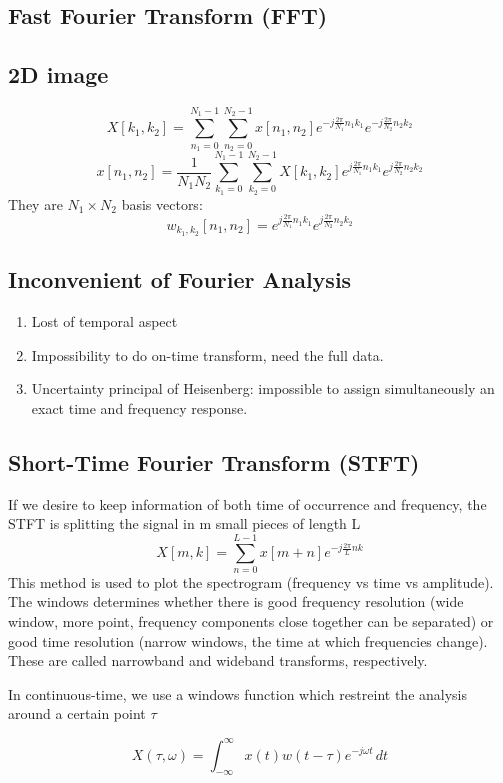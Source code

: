\documentclass[twocolumn]{article}
\numberwithin{equation}{section}
\begin{document}
	\subsection{Fast Fourier Transform (FFT)}


	\subsection{2D image}
$$X[k_1,k_2]= \sum_{n_1=0}^{N_1 -1} \sum_{n_2=0}^{N_2 -1} x[n_1,n_2] e^{-j \frac{2 \pi}{N_1}n_1 k_1}  e^{-j \frac{2 \pi}{N_2}n_2 k_2}$$
$$x[n_1,n_2]= \frac{1}{N_1 N_2} \sum_{k_1=0}^{N_1 -1} \sum_{k_2=0}^{N_2 -1} X[k_1,k_2] e^{j \frac{2 \pi}{N_1}n_1 k_1}  e^{j \frac{2 \pi}{N_2}n_2 k_2}$$
They are $N_1 \times N_2$ basis vectors:
$$w_{k_1,k_2}[n_1,n_2]=e^{j \frac{2 \pi}{N_1}n_1 k_1}  e^{j \frac{2 \pi}{N_2}n_2 k_2}$$



	\subsection{Inconvenient of Fourier Analysis}
\begin{enumerate}
	\item Lost of temporal aspect
	\item Impossibility to do on-time transform, need the full data.
	\item Uncertainty principal of Heisenberg: impossible to assign simultaneously an exact time and frequency response.
\end{enumerate}


	\subsection{Short-Time Fourier Transform (STFT)}
If we desire to keep information of both time of occurrence and frequency, the STFT is splitting the signal in m small pieces of length L
$$X[m,k]=\sum_{n=0}^{L-1} x[m+n]e^{-j\frac{2 \pi}{L}nk}$$
This method is used to plot the spectrogram (frequency vs time vs amplitude). The windows determines whether there is good frequency resolution (wide window, more point, frequency components close together can be separated) or good time resolution (narrow windows, the time at which frequencies change). These are called narrowband and wideband transforms, respectively.

In continuous-time, we use a windows function which restreint the analysis around a certain point $\tau$

$$ X(\tau, \omega) = \int_{-\infty}^{\infty} x(t) w(t-\tau) e^{-j \omega t} \, dt $$
\end{document}

